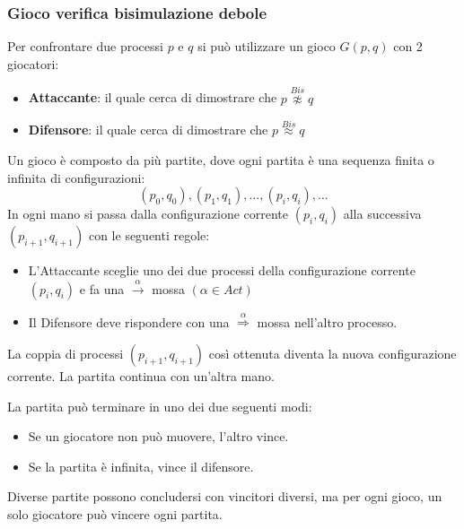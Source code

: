 \subsubsection{Gioco verifica bisimulazione debole}
Per confrontare due processi $p$ e $q$ si può utilizzare un gioco $G(p, q)$ con 2 giocatori:
\begin{itemize}
    \item \textbf{Attaccante}: il quale cerca di dimostrare che $p \stackrel{Bis}{\not\approx} q$
    \item \textbf{Difensore}: il quale cerca di dimostrare che $p \stackrel{Bis}{\approx} q$
\end{itemize}
Un gioco è composto da più partite, dove ogni partita è una sequenza finita o infinita di configurazioni: $$(p_0, q_0), (p_1, q_1), \dots, (p_i, q_i), \dots$$ In ogni mano si passa dalla configurazione corrente $(p_i, q_i)$ alla successiva $(p_{i + 1}, q_{i + 1})$ con le seguenti regole:
\begin{itemize}
    \item L'Attaccante sceglie uno dei due processi della configurazione corrente $(p_i, q_i)$ e fa una $\xrightarrow{\alpha}$ mossa $(\alpha \in Act)$
    \item Il Difensore deve rispondere con una $\stackrel{\alpha}{\Rightarrow}$ mossa nell'altro processo.
\end{itemize}
La coppia di processi $(p_{i+1}, q_{i+1})$ così ottenuta diventa la nuova configurazione corrente. La partita continua con un'altra mano.

La partita può terminare in uno dei due seguenti modi:
\begin{itemize}
    \item Se un giocatore non può muovere, l'altro vince.
    \item Se la partita è infinita, vince il difensore.
\end{itemize}
Diverse partite possono concludersi con vincitori diversi, ma per ogni gioco, un solo giocatore può vincere ogni partita.

